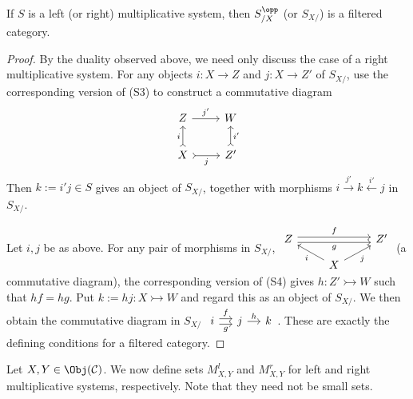 \begin{lemma}\label{prop:S-filtered}
	If $S$ is a left (or right) multiplicative system, then
	$S_{/X}^{\opp}$ (or $S_{X/}$) is a filtered category.
\end{lemma}
\begin{proof}
	By the duality observed above, we need only discuss the case of a right
	multiplicative system. For any objects $i:X\to Z$ and $j:X\to Z'$ of
	$S_{X/}$, use the corresponding version of (S3) to construct a commutative
	diagram
	\[\begin{tikzcd}
		Z \arrow[r, "{j'}"] & W \\
		X \arrow[rightarrowtail, u, "i"] \arrow[rightarrowtail, r, "j"'] & Z' \arrow[rightarrowtail, u, "{i'}"']
	\end{tikzcd}\]
	Then $k:=i'j\in S$ gives an object of $S_{X/}$, together with morphisms
	$i\xrightarrow{j'}k\xleftarrow{i'}j$ in $S_{X/}$.

	Let $i,j$ be as above. For any pair of morphisms in $S_{X/}$,
	$\begin{tikzcd}[row sep=small]
		Z \arrow[shift left, rr, "f"] \arrow[shift right, rr, "g"'] & & Z' \\
		& X \arrow[lu, "i"] \arrow[ru, "j"'] &
	\end{tikzcd}$
	(a commutative diagram), the corresponding version of (S4) gives
	$h:Z'\rightarrowtail W$ such that $hf=hg$. Put
	$k:=hj:X\rightarrowtail W$ and regard this as an object of $S_{X/}$. We
	then obtain the commutative diagram in $S_{X/}$
	$\begin{tikzcd}[column sep=small]
		i \arrow[shift left, r, "f"] \arrow[shift right, r, "g"'] & j \arrow[r, "h"] & k
	\end{tikzcd}$.
	These are exactly the defining conditions for a filtered category.
\end{proof}

Let $X,Y\in\Obj(\mathcal{C})$. We now define sets $M_{X,Y}^l$ and
$M_{X,Y}^r$ for left and right multiplicative systems, respectively. Note
that they need not be small sets.

